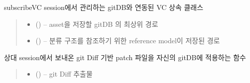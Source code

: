 \documentclass[a4paper,10pt,english]{sphinxmanual}
\begin{document}
\begin{fulllineitems}
\label{\detokenize{_VersionController:subscribeVC}}
\pysigstartsignatures
{}
\pysigstopsignatures
\sphinxAtStartPar
subscribeVC
session에서 관리하는 gitDB와 연동된 VC 상속 클래스
\begin{quote}\begin{description}
\begin{itemize}
\item {} 
\sphinxAtStartPar
{} () – asset을 저장할 gitDB 의 최상위 경로

\item {} 
\sphinxAtStartPar
{} () – 분류 구조를 참조하기 위한 reference model이 저장된 경로

\end{itemize}

\end{description}\end{quote}

\begin{fulllineitems}
\label{\detokenize{_VersionController:subscribeVC.apply}}
\pysigstartsignatures
{}
\pysigstopsignatures
\sphinxAtStartPar
상대 session에서 보내온 git Diff 기반 patch 파일을 자신의 gitDB에 적용하는 함수
\begin{quote}\begin{description}
\begin{itemize}
\item {} 
\sphinxAtStartPar
{} () – git Diff 추출물

\end{itemize}

\end{description}\end{quote}

\end{fulllineitems}


\end{fulllineitems}
\end{document}
